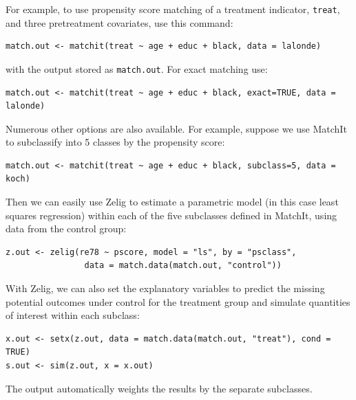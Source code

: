\documentclass[11pt,titlepage]{article}
\begin{document}
For example, to use propensity score matching of a treatment
indicator, \texttt{treat}, and three pretreatment covariates, use this
command:
\begin{verbatim}
match.out <- matchit(treat ~ age + educ + black, data = lalonde)
\end{verbatim}
with the output stored as \texttt{match.out}.  For exact matching use:
\begin{verbatim}
match.out <- matchit(treat ~ age + educ + black, exact=TRUE, data = lalonde)
\end{verbatim}
Numerous other options are also available.  For example, suppose we
use MatchIt to subclassify into 5 classes by the propensity score:
\begin{verbatim}
match.out <- matchit(treat ~ age + educ + black, subclass=5, data = koch)
\end{verbatim}
Then we can easily use Zelig to estimate a parametric model (in this
case least squares regression) within each of the five subclasses
defined in MatchIt, using data from the control group:
\begin{verbatim}
z.out <- zelig(re78 ~ pscore, model = "ls", by = "psclass", 
                data = match.data(match.out, "control"))
\end{verbatim}
With Zelig, we can also set the explanatory variables to predict the
missing potential outcomes under control for the treatment group and
simulate quantities of interest within each subclass:
\begin{verbatim}
x.out <- setx(z.out, data = match.data(match.out, "treat"), cond = TRUE)
s.out <- sim(z.out, x = x.out)
\end{verbatim}
The output automatically weights the results by the separate subclasses.

\baselineskip 


\end{document}
